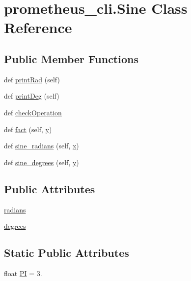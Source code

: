 \hypertarget{classprometheus__cli_1_1_sine}{}\section{prometheus\+\_\+cli.\+Sine Class Reference}
\label{classprometheus__cli_1_1_sine}
\subsection*{Public Member Functions}
\begin{DoxyCompactItemize}
\item 
def \hyperlink{classprometheus__cli_1_1_sine_a7f9d4aa4fd16b7e735e5a13e65f6451e}{print\+Rad} (self)
\item 
def \hyperlink{classprometheus__cli_1_1_sine_a60f89c5014439472c432b7ddf7a1f23c}{print\+Deg} (self)
\item 
def \hyperlink{classprometheus__cli_1_1_sine_a8132407f9de4f24c2ba16ca317f78159}{check\+Operation}
\item 
def \hyperlink{classprometheus__cli_1_1_sine_a18fd347866f39197b3dc6a355fc86c02}{fact} (self, \hyperlink{namespaceprometheus__cli_accf154f79f78ac17fe06c8028e3da02d}{y})
\item 
def \hyperlink{classprometheus__cli_1_1_sine_ad4833c27f7d140d44ba6d2a699013055}{sine\+\_\+radians} (self, \hyperlink{namespaceprometheus__cli_a879d50c5fa9ad1ef941818d332417a9b}{x})
\item 
def \hyperlink{classprometheus__cli_1_1_sine_a4b8ce4d6d54e87062fe0e4e3d65e124f}{sine\+\_\+degrees} (self, \hyperlink{namespaceprometheus__cli_accf154f79f78ac17fe06c8028e3da02d}{y})
\end{DoxyCompactItemize}
\subsection*{Public Attributes}
\begin{DoxyCompactItemize}
\item 
\hyperlink{classprometheus__cli_1_1_sine_a6b7a6a9495a721129804a49262ff0fd8}{radians}
\item 
\hyperlink{classprometheus__cli_1_1_sine_a23158d1b1970c7977417866d3908fb23}{degrees}
\end{DoxyCompactItemize}
\subsection*{Static Public Attributes}
\begin{DoxyCompactItemize}
\item 
float \hyperlink{classprometheus__cli_1_1_sine_abc4697ef15f4b8e0f99a26370c9f3d1c}{P\+I} = 3.
\end{DoxyCompactItemize}


